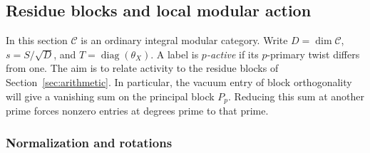 \documentclass[11pt,a4paper]{article}
\numberwithin{equation}{section}
\begin{document}
\subsection{Residue blocks and local modular action}

In this section $\mathcal C$ is an ordinary integral modular category.
Write $D=\dim\mathcal C$, $s=S/\sqrt D$, and $T=\operatorname{diag}(\theta_X)$.
A label is \emph{$p$-active} if its $p$-primary twist differs from one.
The aim is to relate activity to the residue blocks of
Section~\ref{sec:arithmetic}. In particular, the vacuum entry of block
orthogonality will give a vanishing sum on the principal block $P_p$.
Reducing this sum at another prime forces nonzero entries at degrees
prime to that prime.

\subsubsection{Normalization and rotations}
\end{document}
